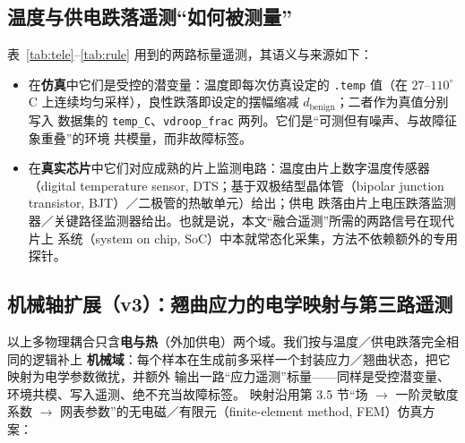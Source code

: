 \documentclass[11pt,a4paper,fontset=mac]{ctexart}
\begin{document}
\subsection{温度与供电跌落遥测“如何被测量”}
表~\ref{tab:tele}--\ref{tab:rule} 用到的两路标量遥测，其语义与来源如下：
\begin{itemize}
\item 在\textbf{仿真}中它们是受控的潜变量：温度即每次仿真设定的 \texttt{.temp} 值（在
$27$--$110^\circ$C 上连续均匀采样），良性跌落即设定的摆幅缩减 $d_\text{benign}$；二者作为真值分别写入
数据集的 \texttt{temp\_C}、\texttt{vdroop\_frac} 两列。它们是“可测但有噪声、与故障征象重叠”的环境
共模量，而非故障标签。
\item 在\textbf{真实芯片}中它们对应成熟的片上监测电路：温度由片上数字温度传感器（digital temperature
sensor, DTS；基于双极结型晶体管（bipolar junction transistor, BJT）／二极管的热敏单元）给出；供电
跌落由片上电压跌落监测器／关键路径监测器给出。也就是说，本文“融合遥测”所需的两路信号在现代片上
系统（system on chip, SoC）中本就常态化采集，方法不依赖额外的专用探针。
\end{itemize}

\subsection{机械轴扩展（v3）：翘曲应力的电学映射与第三路遥测}\label{sec:mech}
以上多物理耦合只含\textbf{电与热}（外加供电）两个域。我们按与温度／供电跌落完全相同的逻辑补上
\textbf{机械域}：每个样本在生成前多采样一个封装应力／翘曲状态，把它映射为电学参数微扰，并额外
输出一路“应力遥测”标量——同样是受控潜变量、环境共模、写入遥测、绝不充当故障标签。
映射沿用第 3.5 节“场 $\to$ 一阶灵敏度系数 $\to$ 网表参数”的无电磁／有限元（finite-element method,
FEM）仿真方案：
\end{document}
